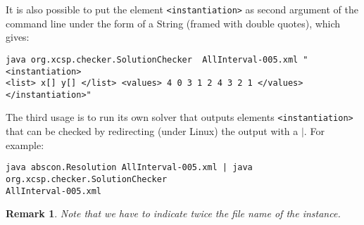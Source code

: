 \documentclass[10pt]{article}
\newtheorem{remark}{Remark}
\newcommand{\xml}[1]{{\tt <#1>}} %
\begin{document}
It is also possible to put the element \xml{instantiation} as second argument of the command line under the form of a String (framed with double quotes), which gives: 

\begin{verbatim}
java org.xcsp.checker.SolutionChecker  AllInterval-005.xml "<instantiation>  
<list> x[] y[] </list> <values> 4 0 3 1 2 4 3 2 1 </values>  </instantiation>"
\end{verbatim}

The third usage is to run its own solver that outputs elements \xml{instantiation} that can be checked by redirecting (under Linux) the output with a $\mid$.
For example:
\begin{verbatim}
java abscon.Resolution AllInterval-005.xml | java org.xcsp.checker.SolutionChecker  
AllInterval-005.xml
\end{verbatim}
  
\begin{remark}
Note that we have to indicate twice the file name of the instance.
\end{remark}
\end{document}
